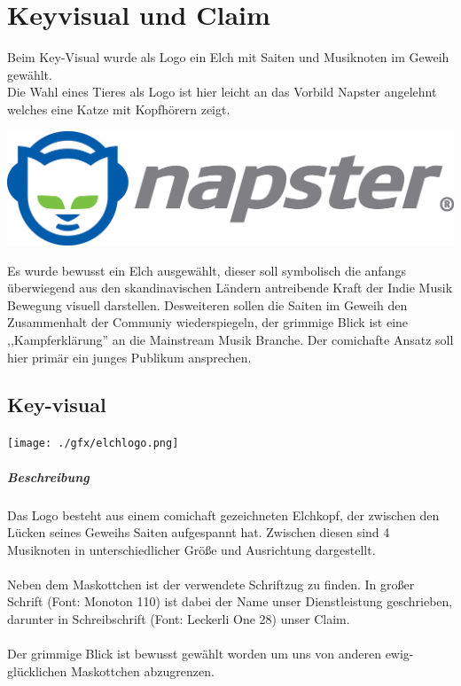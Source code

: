 \label{keyvisual_claim}
\chapter{Keyvisual und Claim}

Beim Key-Visual wurde als Logo ein Elch mit Saiten und Musiknoten im Geweih
gewählt.
\\
Die Wahl eines Tieres als Logo ist hier leicht an das Vorbild Napster
angelehnt welches eine Katze mit Kopfhörern zeigt.

\begin{center}
    \includegraphics[scale=0.4]{./gfx/napster.jpeg}
\end{center}

Es wurde bewusst ein Elch ausgewählt, dieser soll symbolisch die anfangs
überwiegend aus den skandinavischen Ländern antreibende Kraft der Indie Musik
Bewegung visuell darstellen. Desweiteren sollen die Saiten im Geweih den
Zusammenhalt der Communiy wiederspiegeln, der grimmige Blick ist eine
,,Kampferklärung'' an die Mainstream Musik Branche. Der comichafte Ansatz soll
hier primär ein junges Publikum ansprechen.

\section{Key-visual}
\begin{center}
    \texttt{[image: ./gfx/elchlogo.png]}
\end{center}

\paragraph{Beschreibung} Das Logo besteht aus einem comichaft gezeichneten
Elchkopf, der zwischen den Lücken seines Geweihs Saiten aufgespannt hat.
Zwischen diesen sind 4 Musiknoten in unterschiedlicher Größe und Ausrichtung 
dargestellt. 
\\
\\
Neben dem Maskottchen ist der verwendete Schriftzug zu finden.
In großer Schrift (Font: Monoton 110) ist dabei der Name unser Dienstleistung
geschrieben, darunter in Schreibschrift (Font: Leckerli One 28) unser Claim.
\\
\\
Der grimmige Blick ist bewusst gewählt worden um uns von anderen
ewig-glücklichen Maskottchen abzugrenzen.


